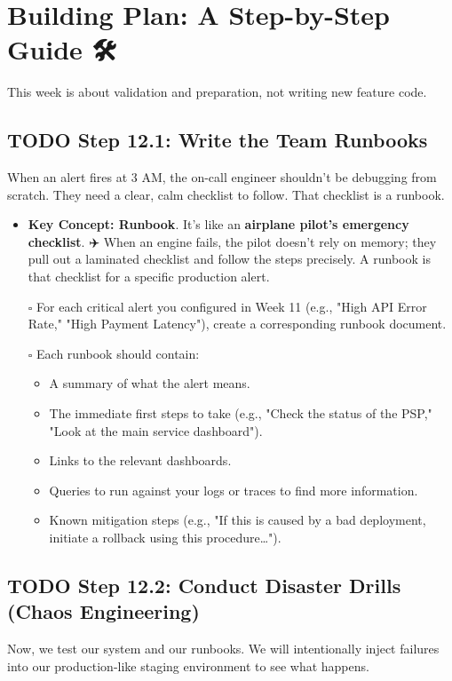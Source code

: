 \documentclass[11pt]{article}
\begin{document}
\section{Building Plan: A Step-by-Step Guide 🛠️}
\label{sec:org7cd86f8}
This week is about validation and preparation, not writing new feature code.
\subsection{{\bfseries\sffamily TODO} Step 12.1: Write the Team Runbooks}
\label{sec:orgea3abd3}
When an alert fires at 3 AM, the on-call engineer shouldn't be debugging from scratch. They need a clear, calm checklist to follow. That checklist is a runbook.

\begin{itemize}
\item \textbf{Key Concept: Runbook}. It's like an \textbf{airplane pilot's emergency checklist}. ✈️ When an engine fails, the pilot doesn't rely on memory; they pull out a laminated checklist and follow the steps precisely. A runbook is that checklist for a specific production alert.
\item[{$\square$}] For each critical alert you configured in Week 11 (e.g., "High API Error Rate," "High Payment Latency"), create a corresponding runbook document.
\item[{$\square$}] Each runbook should contain:
\begin{itemize}
\item A summary of what the alert means.
\item The immediate first steps to take (e.g., "Check the status of the PSP," "Look at the main service dashboard").
\item Links to the relevant dashboards.
\item Queries to run against your logs or traces to find more information.
\item Known mitigation steps (e.g., "If this is caused by a bad deployment, initiate a rollback using this procedure\ldots{}").
\end{itemize}
\end{itemize}
\subsection{{\bfseries\sffamily TODO} Step 12.2: Conduct Disaster Drills (Chaos Engineering)}
\label{sec:org23ebe51}
Now, we test our system and our runbooks. We will intentionally inject failures into our production-like staging environment to see what happens.
\end{document}
